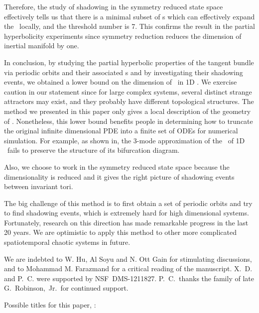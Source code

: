 \documentclass[prl,aps,preprint,showpacs]{revtex4-1} %
\begin{document}
Therefore, the study of shadowing
in the symmetry reduced state space effectively tells us that
there is a minimal
subset of \Fv s which can effectively expand the \inm\ locally, and the
threshold number is 7. This confirms the result in the partial
hyperbolicity experiments since symmetry reduction reduces the dimension
of inertial manifold by one.

In conclusion, by studying the partial hyperbolic properties of the
tangent bundle via periodic
orbits and their associated \Fv s
and by investigating their shadowing events,
we obtained a lower bound on the
dimension of \inm\ in 1D \KSe. We exercise caution in our statement
since for large complex systems, several distinct strange attractors
may exist, and they probably have different topological structures.
The method we presented in this paper only gives a local
description of the geometry of \inm. Nonetheless, this lower bound
benefits people in determining how to truncate the original
infinite dimensional PDE into a finite set of ODEs for numerical
simulation. For example, as shown in,
the 3-mode approximation
of the \inm\ of 1D \KSe\ fails to preserve the structure of its
bifurcation diagram.

Also, we choose to work in the symmetry reduced state space
because the dimensionality is reduced and it gives the
right picture of shadowing events between invariant tori.

The big challenge of this method is to first obtain
a set of periodic orbits and try to find shadowing
events, which is extremely hard for high dimensional systems.
Fortunately, research on this direction has made remarkable
progress in the last 20 years. We are optimistic to apply this
method to other more complicated spatiotemporal chaotic systems
in future.


\acknowledgements

We are indebted to
W. Hu,
Al Soyu
and
N. Ott Gain
for stimulating discussions,
and to
Mohammad M. Farazmand
for
a critical reading of the manuscript.
X.~D. and P.~C. were supported by
NSF~DMS-1211827.
P.~C.\ thanks the family of late G.~Robinson,~Jr.\ for continued support.



\ifboyscout
\newpage
\newcommand{\toCB}{\marginpar{\footnotesize 2CB}}  %
\newcommand{\inCB}{\marginpar{\footnotesize now in CB}} %
Possible titles for this paper, :
\end{document}

